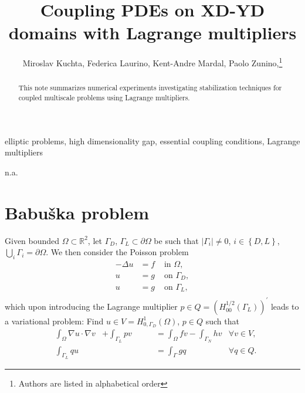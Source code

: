 \documentclass[r]{siamart171218}
\title{Coupling PDEs on XD-YD domains with Lagrange multipliers}
\author{
Miroslav Kuchta, Federica Laurino, Kent-Andre Mardal, Paolo Zunino,\thanks{Authors are listed in alphabetical order}
}
\begin{document}
\maketitle

\begin{abstract}
  This note summarizes numerical experiments investigating stabilization
  techniques for coupled multiscale problems using Lagrange multipliers. 
\end{abstract}

\begin{keywords}
elliptic problems, high dimensionality gap, essential coupling conditions, Lagrange multipliers
\end{keywords}

\begin{AMS}
n.a.
\end{AMS}

 
\newcommand{\semi}[1]{\lvert{#1}\rvert}
\newcommand{\norm}[1]{\lVert{#1}\rVert}
\newcommand{\jump}[1]{\ensuremath{[\![#1]\!]} }
\newcommand{\avg}[1]{\ensuremath{\left\{\!\left\{#1\right\}\!\right\}} }


\newtheorem{thm}{Theorem}[section]
\newtheorem{prop}{Property}[section]
\theoremstyle{remark}
\newtheorem{remark}{Remark}[section]
 

\section{Babu{\v s}ka problem}\label{sec:babuska}
Given bounded $\Omega\subset\mathbb{R}^2$, let $\Gamma_D$, $\Gamma_L \subset \partial \Omega$ be such that $\semi{\Gamma_i}\neq 0$,
$i\in\left\{D, L\right\}$, $\bigcup_{i}\Gamma_i=\partial\Omega$.
We then consider the Poisson problem 
\[
\begin{aligned}
-\Delta u &= f &\mbox{ in }\Omega,\\
u &= g &\mbox{ on }\Gamma_D,\\
u &= g &\mbox{ on }\Gamma_L,\\
\end{aligned}
\]
which upon introducing the Lagrange multiplier $p\in Q=(H^{1/2}_{00}(\Gamma_L))^{\prime}$
leads to a variational problem: Find $u\in V=H^1_{0, \Gamma_D}(\Omega)$,
$p\in Q$ such that
%
\begin{equation}\label{eq:bab}
  \begin{aligned}
    &\int_{\Omega} \nabla u\cdot \nabla v &+ \int_{\Gamma_L}p v &= \int_{\Omega} f v - \int_{\Gamma_N}h v &\forall v\in V,\\
    &\int_{\Gamma_L}q u  &\phantom{+\int_{\Omega} \nabla u\cdot \nabla v} &= \int_{\Gamma} g q &\forall q\in Q.
  \end{aligned}
\end{equation}
%
\end{document}
